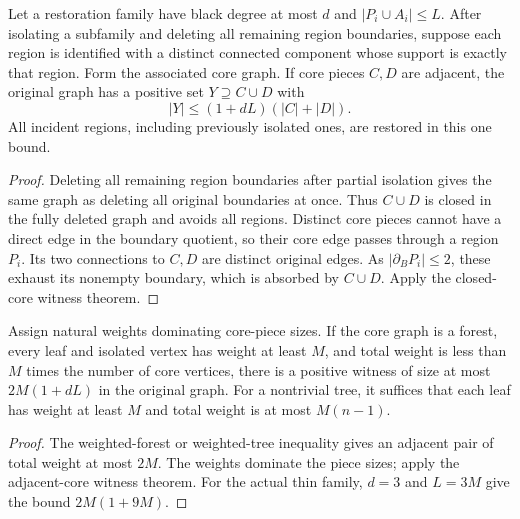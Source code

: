 \begin{theorem}
  \label{thm:lowerbounds-algebraic-core-pair-positive}
  \leanok
  Let a restoration family have black degree at most $d$ and
  $|P_i\cup A_i|\le L$. After isolating a subfamily and deleting all
  remaining region boundaries, suppose each region is identified with
  a distinct connected component whose support is exactly that region.
  Form the associated core graph.
  If core pieces $C,D$ are adjacent, the original graph has a positive set
  $Y\supseteq C\cup D$ with
  \[
    |Y|\le (1+dL)(|C|+|D|).
  \]
  All incident regions, including previously isolated ones, are restored
  in this one bound.
\end{theorem}
\begin{proof}
  \leanok
  Deleting all remaining region boundaries after partial isolation gives
  the same graph as deleting all original boundaries at once. Thus
  $C\cup D$ is closed in the fully deleted graph and avoids all regions.
  Distinct core pieces cannot have a direct edge in the boundary quotient,
  so their core edge passes through a region $P_i$. Its two connections
  to $C,D$ are distinct original edges. As $|\partial_B P_i|\le2$, these
  exhaust its nonempty boundary, which is absorbed by $C\cup D$.
  Apply the closed-core witness theorem.
\end{proof}

\begin{theorem}
  \label{thm:lowerbounds-algebraic-weighted-core-positive}
  \leanok
  Assign natural weights dominating core-piece sizes. If the core graph
  is a forest, every leaf and isolated vertex has weight at least $M$,
  and total weight is less than $M$ times the number of core vertices,
  there is a positive witness of size at most $2M(1+dL)$ in the original
  graph. For a nontrivial tree, it suffices that each leaf has weight at
  least $M$ and total weight is at most $M(n-1)$.
\end{theorem}
\begin{proof}
  \leanok
  The weighted-forest or weighted-tree inequality gives an adjacent pair
  of total weight at most $2M$. The weights dominate the piece sizes;
  apply the adjacent-core witness theorem. For the actual thin family,
  $d=3$ and $L=3M$ give the bound $2M(1+9M)$.
\end{proof}

